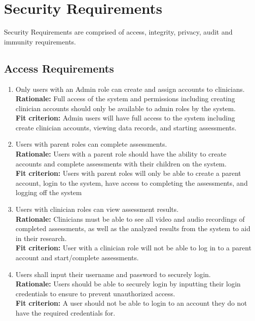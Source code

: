 \documentclass[12pt]{article}
\begin{document}
\newpage

\section{Security Requirements}
\hspace{2em}Security Requirements are comprised of access, integrity, privacy, audit and immunity requirements.
\subsection{Access Requirements}
\begin{enumerate}[label={SR-AC\arabic*}. ]
  \item Only users with an Admin role can create and assign accounts to clinicians.\\
  \textbf{Rationale: }Full access of the system and permissions including creating clinician accounts should only be available to admin roles by the system. \\
  \textbf{Fit criterion: }Admin users will have full access to the system including create clinician accounts, viewing data records, and starting assessments. 
  \item Users with parent roles can complete assessments.\\
  \textbf{Rationale: }Users with a parent role should have the ability to create accounts and complete assessments with their children on the system.\\
  \textbf{Fit criterion: }Users with parent roles will only be able to create a parent account, login to the system, have access to completing the assessments, and logging off the system 
  \item Users with clinician roles can view assessment results.\\
  \textbf{Rationale: }Clinicians must be able to see all video and audio recordings of completed assessments, as well as the analyzed results from the system to aid in their research. \\
  \textbf{Fit criterion: }User with a clinician role will not be able to log in to a parent account and start/complete assessments. 
  \item Users shall input their username and password to securely login.\\
  \textbf{Rationale: }Users should be able to securely login by inputting their login credentials to ensure to prevent unauthorized access. \\
  \textbf{Fit criterion: }A user should not be able to login to an account they do not have the required credentials for.
\end{enumerate}
\end{document}

